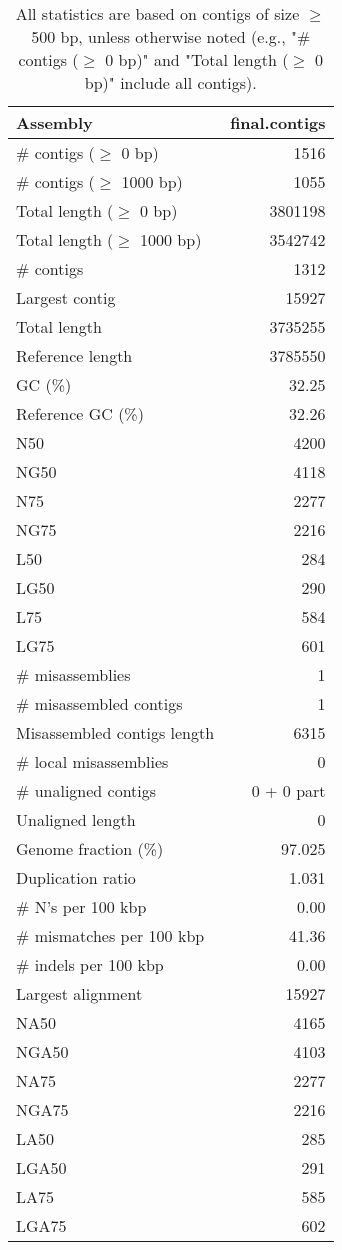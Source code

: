 \documentclass[12pt,a4paper]{article}
\begin{document}
\begin{table}[ht]
\begin{center}
\caption{All statistics are based on contigs of size $\geq$ 500 bp, unless otherwise noted (e.g., "\# contigs ($\geq$ 0 bp)" and "Total length ($\geq$ 0 bp)" include all contigs).}
\begin{tabular}{|l*{1}{|r}|}
\hline
Assembly & final.contigs \\ \hline
\# contigs ($\geq$ 0 bp) & 1516 \\ \hline
\# contigs ($\geq$ 1000 bp) & 1055 \\ \hline
Total length ($\geq$ 0 bp) & 3801198 \\ \hline
Total length ($\geq$ 1000 bp) & 3542742 \\ \hline
\# contigs & 1312 \\ \hline
Largest contig & 15927 \\ \hline
Total length & 3735255 \\ \hline
Reference length & 3785550 \\ \hline
GC (\%) & 32.25 \\ \hline
Reference GC (\%) & 32.26 \\ \hline
N50 & 4200 \\ \hline
NG50 & 4118 \\ \hline
N75 & 2277 \\ \hline
NG75 & 2216 \\ \hline
L50 & 284 \\ \hline
LG50 & 290 \\ \hline
L75 & 584 \\ \hline
LG75 & 601 \\ \hline
\# misassemblies & 1 \\ \hline
\# misassembled contigs & 1 \\ \hline
Misassembled contigs length & 6315 \\ \hline
\# local misassemblies & 0 \\ \hline
\# unaligned contigs & 0 + 0 part \\ \hline
Unaligned length & 0 \\ \hline
Genome fraction (\%) & 97.025 \\ \hline
Duplication ratio & 1.031 \\ \hline
\# N's per 100 kbp & 0.00 \\ \hline
\# mismatches per 100 kbp & 41.36 \\ \hline
\# indels per 100 kbp & 0.00 \\ \hline
Largest alignment & 15927 \\ \hline
NA50 & 4165 \\ \hline
NGA50 & 4103 \\ \hline
NA75 & 2277 \\ \hline
NGA75 & 2216 \\ \hline
LA50 & 285 \\ \hline
LGA50 & 291 \\ \hline
LA75 & 585 \\ \hline
LGA75 & 602 \\ \hline
\end{tabular}
\end{center}
\end{table}
\end{document}
